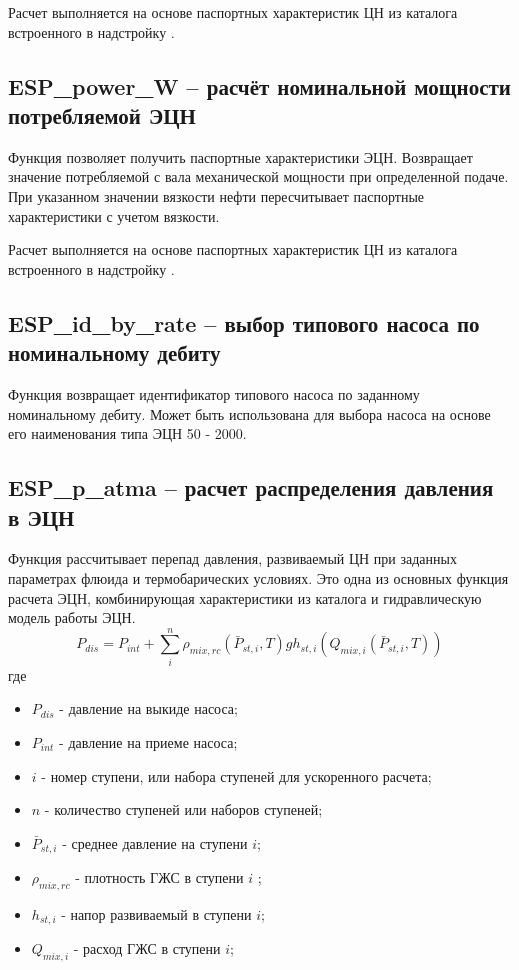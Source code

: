 
Расчет выполняется на основе паспортных характеристик ЦН из каталога встроенного в надстройку \unf{}. 

\subsection{ESP\_power\_W – расчёт номинальной мощности потребляемой ЭЦН}
Функция позволяет получить паспортные характеристики ЭЦН. Возвращает значение потребляемой с вала механической мощности при определенной подаче. При указанном значении вязкости нефти пересчитывает паспортные характеристики с учетом вязкости. 


Расчет выполняется на основе паспортных характеристик ЦН из каталога встроенного в надстройку \unf{}. 

\subsection{ESP\_id\_by\_rate – выбор типового насоса по номинальному дебиту}
Функция возвращает идентификатор типового насоса по заданному номинальному дебиту. 
Может быть использована для выбора насоса на основе его наименования типа ЭЦН 50 - 2000.

\subsection{ESP\_p\_atma – расчет распределения давления в ЭЦН}
Функция рассчитывает перепад давления, развиваемый ЦН при заданных параметрах флюида и термобарических условиях. Это одна из основных функция расчета ЭЦН, комбинирующая характеристики из каталога и гидравлическую модель работы ЭЦН.
$$ P_{dis} = P_{int} + \sum_i^n{\rho_{mix,rc}(\bar{P}_{st,i},T) g h_{st,i}(Q_{mix,i}(\bar{P}_{st,i},T))} $$
где 
\begin{itemize}
	\item $P_{dis}$ - давление на выкиде насоса;
	\item $P_{int}$ - давление на приеме насоса;
	\item $i$ - номер ступени, или набора ступеней для ускоренного расчета;
	\item $n$ - количество ступеней или наборов ступеней;
	\item $\bar{P}_{st,i}$ - среднее давление на  ступени $i$;
	\item $\rho_{mix,rc}$ - плотность ГЖС  в ступени $i$ ;
	\item $h_{st,i}$ - напор развиваемый  в ступени $i$;
	\item $Q_{mix,i}$ - расход ГЖС в ступени $i$;
	
\end{itemize}


